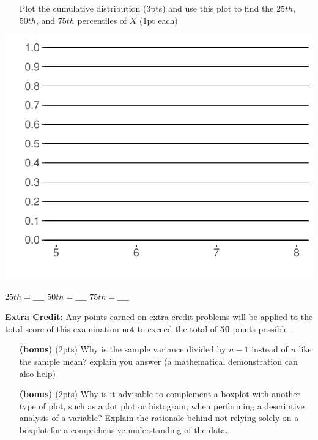 \documentclass[
]{article}
\begin{document}
\begin{enumerate}
\item[]{Plot the cumulative distribution (3pts) and use this plot to find the $25th$, $50th$, and $75th$ percentiles of $X$ (1pt each)}
\end{enumerate}

\includegraphics{Exam_1_Version_B_files/figure-latex/unnamed-chunk-8-1.pdf}

\(25th = \_\_\_\_\) \(50th = \_\_\_\_\) \(75th = \_\_\_\_\)

\textbf{Extra Credit: } Any points earned on extra credit problems will
be applied to the total score of this examination not to exceed the
total of \textbf{50} points possible.

\begin{enumerate}
\item[\bf(bonus)]{ (2pts) Why is the sample variance divided by $n-1$ instead of $n$ like the sample mean? explain you answer (a mathematical demonstration can also help)}
\item[]
\item[]
\end{enumerate}

\begin{enumerate}
\item[\bf(bonus)]{ (2pts) Why is it advisable to complement a boxplot with another type of plot, such as a dot plot or histogram, when performing a descriptive analysis of a variable? Explain the rationale behind not relying solely on a boxplot for a comprehensive understanding of the data.}
\item[]
\end{enumerate}
\end{document}
